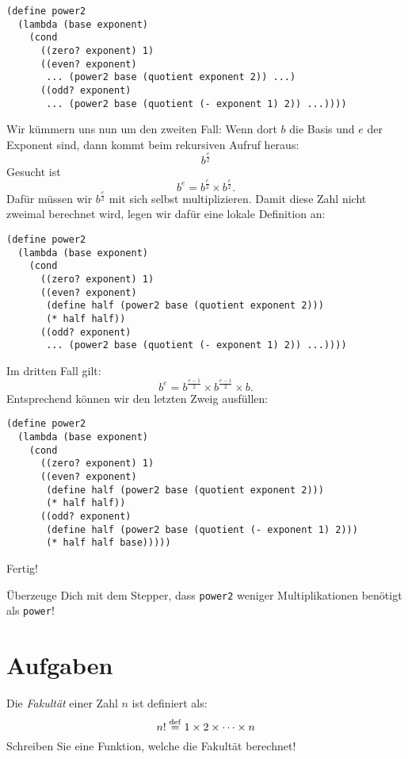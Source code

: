 %
\begin{lstlisting}
(define power2
  (lambda (base exponent)
    (cond
      ((zero? exponent) 1)
      ((even? exponent)
       ... (power2 base (quotient exponent 2)) ...)
      ((odd? exponent)
       ... (power2 base (quotient (- exponent 1) 2)) ...))))
\end{lstlisting}
%
Wir kümmern uns nun um den zweiten Fall: Wenn dort $b$ die Basis und
$e$ der Exponent sind, dann kommt beim rekursiven Aufruf heraus:
%
\begin{displaymath}
  b^{\frac{e}{2}}
\end{displaymath}
%
Gesucht ist \[b^e = b^{\frac{e}{2}} \times b^{\frac{e}{2}}.\]
Dafür müssen wir $b^{\frac{e}{2}}$ mit sich selbst
multiplizieren. Damit diese Zahl
nicht zweimal berechnet wird, legen wir dafür eine lokale Definition an:
%
\begin{lstlisting}
(define power2
  (lambda (base exponent)
    (cond
      ((zero? exponent) 1)
      ((even? exponent)
       (define half (power2 base (quotient exponent 2)))
       (* half half))
      ((odd? exponent)
       ... (power2 base (quotient (- exponent 1) 2)) ...))))
\end{lstlisting}
%
Im dritten Fall gilt:
\begin{displaymath}
  b^e = b^{\frac{e-1}{2}} \times b^{\frac{e-1}{2}} \times b.
\end{displaymath}
%
Entsprechend können wir den letzten Zweig ausfüllen:
%
\begin{lstlisting}
(define power2
  (lambda (base exponent)
    (cond
      ((zero? exponent) 1)
      ((even? exponent)
       (define half (power2 base (quotient exponent 2)))
       (* half half))
      ((odd? exponent)
       (define half (power2 base (quotient (- exponent 1) 2)))
       (* half half base)))))
\end{lstlisting}
%
Fertig!
\begin{aufgabe}
  Überzeuge Dich mit dem Stepper, dass \lstinline{power2} weniger
  Multiplikationen benötigt als \lstinline{power}!
\end{aufgabe}

\section*{Aufgaben}

\begin{aufgabe}
  Die \textit{Fakultät} einer Zahl $n$ ist definiert als:
  \begin{displaymath}
    n! \stackrel{\rm def}{=} 1 \times 2 \times \cdots \times n
  \end{displaymath}
  Schreiben Sie eine Funktion, welche die Fakultät berechnet!
\end{aufgabe}

